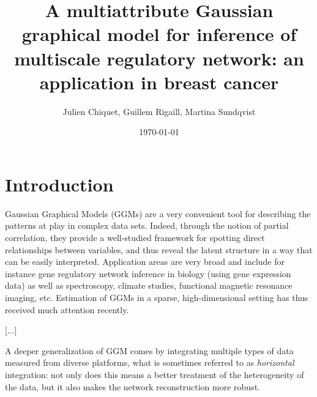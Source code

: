 \documentclass[a4paper]{article}
\title{A multiattribute Gaussian graphical model for inference of
  multiscale regulatory network: an application in breast cancer}
\date{\today}
\author{Julien Chiquet, Guillem Rigaill, Martina Sundqvist}
\begin{document}
\maketitle

\section{Introduction}


Gaussian Graphical Models (GGMs)
\cite{1996_Book_Lauritzen,whittaker1990graphical} are a very
convenient tool for describing the patterns at play in complex data
sets.  Indeed, through the notion of partial correlation, they provide
a well-studied framework for spotting direct relationships between
variables, and thus reveal the latent structure in a way that can be
easily interpreted. Application areas are very broad and include for
instance gene regulatory network inference in biology (using gene
expression data) as well as spectroscopy, climate studies, functional
magnetic resonance imaging, etc.  Estimation of GGMs in a sparse,
high-dimensional setting has thus received much attention recently.


[...]

A deeper generalization of GGM comes by integrating multiple types of
data measured from diverse platforms, what is sometimes referred to as
\emph{horizontal} integration: not only does this means a better
treatment of the heterogeneity of the data, but it also makes the
network reconstruction more robust.











\end{document}
